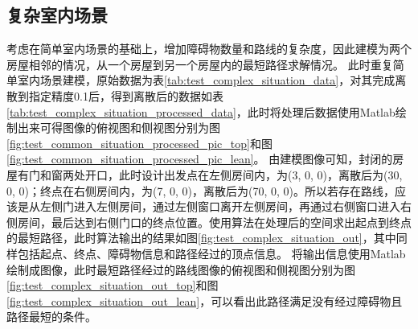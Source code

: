 \subsection{复杂室内场景}
\par 考虑在简单室内场景的基础上，增加障碍物数量和路线的复杂度，因此建模为两个房屋相邻的情况，从一个房屋到另一个房屋内的最短路径求解情况。
此时重复简单室内场景建模，原始数据为表\ref{tab:test_complex_situation_data}，对其完成离散到指定精度0.1后，得到离散后的数据如表\ref{tab:test_complex_situation_processed_data}，此时将处理后数据使用Matlab绘制出来可得图像的俯视图和侧视图分别为图\ref{fig:test_common_situation_processed_pic_top}和图\ref{fig:test_common_situation_processed_pic_lean}。
由建模图像可知，封闭的房屋有门和窗两处开口，此时设计出发点在左侧房间内，为(3, 0, 0)，离散后为(30, 0, 0)；终点在右侧房间内，为(7, 0, 0)，离散后为(70, 0, 0)。所以若存在路线，应该是从左侧门进入左侧房间，通过左侧窗口离开左侧房间，再通过右侧窗口进入右侧房间，最后达到右侧门口的终点位置。使用算法在处理后的空间求出起点到终点的最短路径，此时算法输出的结果如图\ref{fig:test_complex_situation_out}，其中同样包括起点、终点、障碍物信息和路径经过的顶点信息。
将输出信息使用Matlab绘制成图像，此时最短路径经过的路线图像的俯视图和侧视图分别为图\ref{fig:test_complex_situation_out_top}和图\ref{fig:test_complex_situation_out_lean}，可以看出此路径满足没有经过障碍物且路径最短的条件。
